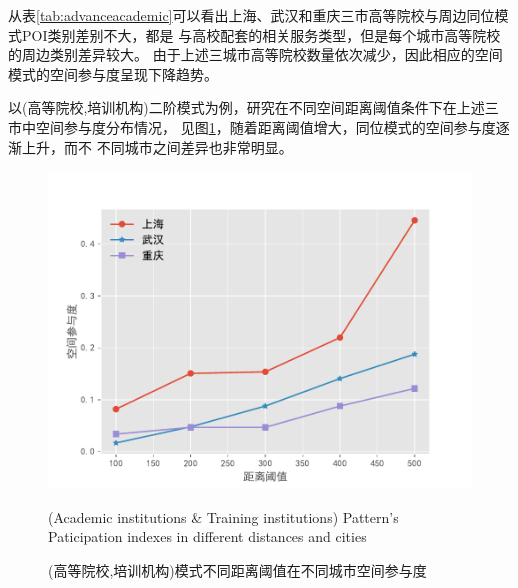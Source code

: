 从表\ref{tab:advanceacademic}可以看出上海、武汉和重庆三市高等院校与周边同位模式POI类别差别不大，都是
与高校配套的相关服务类型，但是每个城市高等院校的周边类别差异较大。
由于上述三城市高等院校数量依次减少，因此相应的空间模式的空间参与度呈现下降趋势。

以(高等院校,培训机构)二阶模式为例，研究在不同空间距离阈值条件下在上述三市中空间参与度分布情况，
见图\ref{fig:participationIndexes}，随着距离阈值增大，同位模式的空间参与度逐渐上升，而不
不同城市之间差异也非常明显。
\begin{figure}
  \centering
  \includegraphics[scale=0.8]{figures/Participate.pdf} \\
  \caption{(高等院校,培训机构)模式不同距离阈值在不同城市空间参与度}{(Academic institutions \& Training institutions) Pattern's Paticipation indexes in different distances and cities}
  \label{fig:participationIndexes}
\end{figure}

